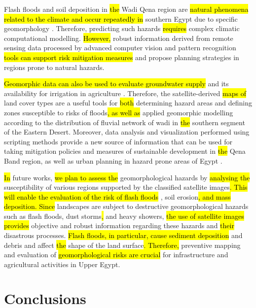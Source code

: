 \documentclass[information,article,submit,pdftex,moreauthors]{Definitions/mdpi}
\begin{document}
Flash floods and soil deposition in \hl{the }Wadi Qena region are \hl{natural phenomena related to the climate and occur repeatedly in } southern Egypt due to specific geomorphology \cite{ElShamy}. Therefore, predicting such hazards \hl{requires }complex climatic computational modelling. \hl{However, }robust information derived from remote sensing data processed by advanced computer vision and pattern recognition \hl{tools can support risk mitigation measures }and propose planning strategies in regions prone to natural hazards.

\hl{Geomorphic data can also be used to evaluate groundwater supply }\cite{Abdelkhalek2021,Abdelkareem} and its availability for irrigation in agriculture \cite{Kamal2021}.
Therefore, the satellite-derived \hl{maps of }land cover types are a useful tools for \hl{both }determining hazard areas and defining zones susceptible to risks of floods\hl{, as well as }applied geomorphic modelling according to the distribution of fluvial network of wadi in \hl{the } southern segment of the Eastern Desert. Moreover, data analysis and visualization performed using scripting methods provide a new source of information that can be used for taking mitigation policies and measures of sustainable development in \hl{the }Qena Band region, as well as urban planning in hazard prone areas of Egypt \cite{ABDELAAL2020103671}. 

\hl{In }future works, \hl{we plan to assess the }geomorphological hazards by \hl{analysing the }susceptibility of various regions supported by the classified satellite images\hl{. This will enable the evaluation of the risk of flash floods} , soil erosion\hl{, and mass deposition. Since } landscapes are subject to destructive geomorphological hazards such as flash floods, dust storms\hl{, }and heavy showers, \hl{the use of satellite images provides }objective and robust information regarding these hazards and \hl{their }disastrous processes. \hl{Flash floods, in particular, cause sediment deposition }and debris and affect \hl{the }shape of the land surface\hl{. Therefore, }preventive mapping and evaluation of \hl{geomorphological risks are crucial }for infrastructure and agricultural activities in Upper Egypt.

\section{Conclusions}
\end{document}
